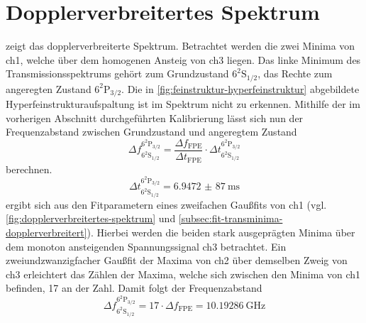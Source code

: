 \documentclass[../bericht.tex]{subfiles}
\begin{document}
    \section{Dopplerverbreitertes Spektrum}

       zeigt das dopplerverbreiterte Spektrum. Betrachtet werden die zwei Minima von ch1, welche über dem homogenen Ansteig von ch3 liegen. Das linke Minimum des Transmissionsspektrums gehört zum Grundzustand $\mathrm{6^2S_{1/2}}$, das Rechte zum angeregten Zustand $\mathrm{6^2P_{3/2}}$. Die in \cref{fig:feinstruktur-hyperfeinstruktur} abgebildete Hyperfeinstrukturaufspaltung ist im Spektrum nicht zu erkennen. Mithilfe der im vorherigen Abschnitt durchgeführten Kalibrierung lässt sich nun der Frequenzabstand zwischen Grundzustand und angeregtem Zustand
      \begin{equation*}
        \Delta f_\mathrm{6^2S_{1/2}}^\mathrm{6^2P_{3/2}} = \frac{\Delta f_\mathrm{FPE}}{\Delta t_\mathrm{FPE}}\cdot \Delta t_\mathrm{6^2S_{1/2}}^\mathrm{6^2P_{3/2}}
      \end{equation*}
      berechnen.
      \begin{equation*}
        \Delta t_\mathrm{6^2S_{1/2}}^\mathrm{6^2P_{3/2}}= \SI{6,9472(87)}{\milli\second}
      \end{equation*}
      ergibt sich aus den Fitparametern eines zweifachen Gau\ss{}fits von ch1 (vgl. \cref{fig:dopplerverbreitertes-spektrum} und \cref{subsec:fit-transminima-dopplerverbreitert}). Hierbei werden die beiden stark ausgeprägten Minima über dem monoton ansteigenden Spannungssignal ch3 betrachtet. Ein zweiundzwanzigfacher Gau\ss{}fit der Maxima von ch2 über demselben Zweig von ch3 erleichtert das Zählen der Maxima, welche sich zwischen den Minima von ch1 befinden, 17 an der Zahl. Damit folgt der Frequenzabstand
      \begin{equation*}
        \Delta f_\mathrm{6^2S_{1/2}}^\mathrm{6^2P_{3/2}} = 17 \cdot \Delta f_\mathrm{FPE} = \SI{10,19286}{\giga\hertz}
      \end{equation*}
\end{document}
